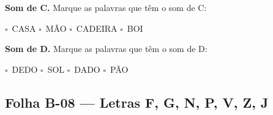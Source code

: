 \begin{somletra}[title={\faMusic~Som das Letras C e D --- B\^onus (n\~ao vale nota)}]
\textbf{Som de C.} Marque as palavras que t\^e{}m o som de C:
\begin{center}
$\square$~CASA \quad $\square$~M\~AO \quad $\square$~CADEIRA \quad $\square$~BOI
\end{center}

\textbf{Som de D.} Marque as palavras que t\^e{}m o som de D:
\begin{center}
$\square$~DEDO \quad $\square$~SOL \quad $\square$~DADO \quad $\square$~P\~AO
\end{center}

\end{somletra}



\subsection{Folha B-08 --- Letras F, G, N, P, V, Z, J}

